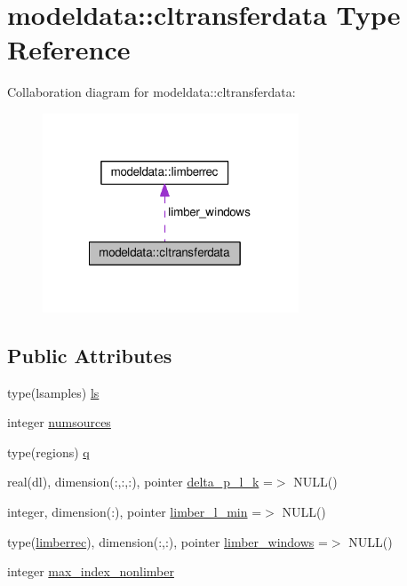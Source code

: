 \hypertarget{structmodeldata_1_1cltransferdata}{}\section{modeldata\+:\+:cltransferdata Type Reference}
\label{structmodeldata_1_1cltransferdata}


Collaboration diagram for modeldata\+:\+:cltransferdata\+:
\nopagebreak
\begin{figure}[H]
\begin{center}
\leavevmode
\includegraphics[width=216pt]{structmodeldata_1_1cltransferdata__coll__graph}
\end{center}
\end{figure}
\subsection*{Public Attributes}
\begin{DoxyCompactItemize}
\item 
type(lsamples) \mbox{\hyperlink{structmodeldata_1_1cltransferdata_a16a7eb16d5036d4793c7f88536e6850d}{ls}}
\item 
integer \mbox{\hyperlink{structmodeldata_1_1cltransferdata_a7ccf13959978b37dc72d684758812340}{numsources}}
\item 
type(regions) \mbox{\hyperlink{structmodeldata_1_1cltransferdata_a01892c6c3f890a63ec85a2fbf6ef15c9}{q}}
\item 
real(dl), dimension(\+:,\+:,\+:), pointer \mbox{\hyperlink{structmodeldata_1_1cltransferdata_a36f59d4c2685a11878249852d0fd6c3a}{delta\+\_\+p\+\_\+l\+\_\+k}} =$>$ N\+U\+LL()
\item 
integer, dimension(\+:), pointer \mbox{\hyperlink{structmodeldata_1_1cltransferdata_a622fc24c035f2a3a04638dbea47480d4}{limber\+\_\+l\+\_\+min}} =$>$ N\+U\+LL()
\item 
type(\mbox{\hyperlink{structmodeldata_1_1limberrec}{limberrec}}), dimension(\+:,\+:), pointer \mbox{\hyperlink{structmodeldata_1_1cltransferdata_ab22b7dc4d14a3a2ef9d4e517b5b35e13}{limber\+\_\+windows}} =$>$ N\+U\+LL()
\item 
integer \mbox{\hyperlink{structmodeldata_1_1cltransferdata_aee83089f429ce28b893d709f9e483cae}{max\+\_\+index\+\_\+nonlimber}}
\end{DoxyCompactItemize}



